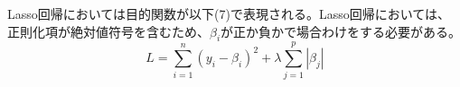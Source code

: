 \documentclass[uplatex]{jsarticle}
\begin{document}
Lasso回帰においては目的関数が以下(7)で表現される。Lasso回帰においては、正則化項が絶対値符号を含むため、$\beta_i$が正か負かで場合わけをする必要がある。
\begin{equation}
  L = \sum_{i=1}^n \left(y_i - \beta_i \right)^2 + \lambda \sum_{j=1}^p |\beta_j|
\end{equation}

%
\end{document}
